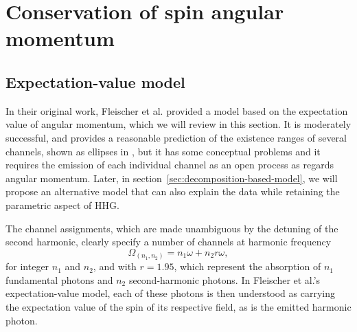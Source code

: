 \section{Conservation of spin angular momentum}

\subsection{Expectation-value model}
\label{sec:expectation-value-model}
In their original work, Fleischer et al. provided a model based on the expectation value of angular momentum, which we will review in this section. It is moderately successful, and provides a reasonable prediction of the existence ranges of several channels, shown as ellipses in , but it has some conceptual problems and it requires the emission of each individual channel as an open process as regards angular momentum. Later, in section~\ref{sec:decomposition-based-model}, we will propose an alternative model that can also explain the data while retaining the parametric aspect of HHG.


The channel assignments, which are made unambiguous by the detuning of the second harmonic, clearly specify a number of channels at harmonic frequency
\begin{equation}
 \Omega_{(n_1,n_2)}=n_1\omega+n_2 r\omega,
\end{equation}
for integer $n_1$ and $n_2$, and with $r=1.95$, which represent the absorption of $n_1$ fundamental photons and $n_2$ second-harmonic photons. In Fleischer et al.'s expectation-value model, each of these photons is then understood as carrying the expectation value of the spin of its respective field, as is the emitted harmonic photon.


